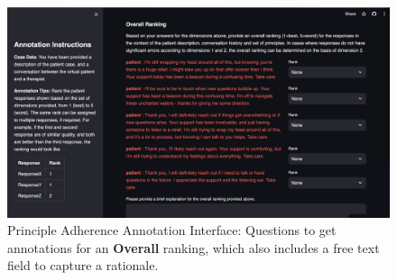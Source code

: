 \documentclass[11pt]{article}
\begin{document}
\begin{figure}
    \centering
    \includegraphics[width=\textwidth]{Study Screenshots/response-ranking-annotation-interface/overall.png}
    \caption{Principle Adherence Annotation Interface: Questions to get annotations for an \textbf{Overall} ranking, which also includes a free text field to capture a rationale.}
    \label{fig:ranking-interface-overall}
\end{figure}
\end{document}
